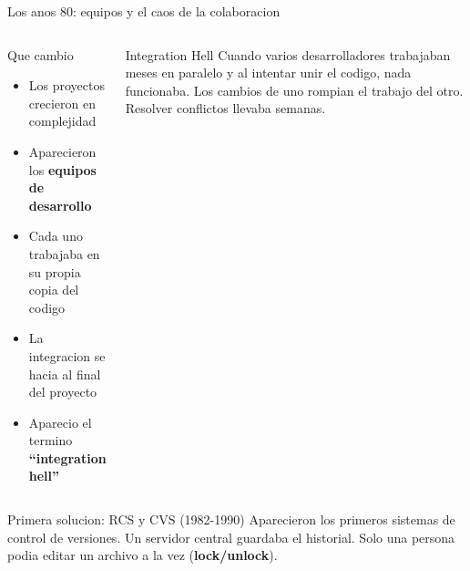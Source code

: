 \documentclass[aspectratio=169]{beamer}
\begin{document}
\begin{frame}{Los anos 80: equipos y el caos de la colaboracion}
  \begin{columns}
    \begin{block}{Que cambio}
      \begin{itemize}
        \item Los proyectos crecieron en complejidad
        \item Aparecieron los \textbf{equipos de desarrollo}
        \item Cada uno trabajaba en su propia copia del codigo
        \item La integracion se hacia al final del proyecto
        \item Aparecio el termino \textbf{``integration hell''}
      \end{itemize}
    \end{block}

    \begin{alertblock}{Integration Hell}
      Cuando varios desarrolladores trabajaban meses en paralelo y al intentar unir el codigo, nada funcionaba. Los cambios de uno rompian el trabajo del otro. Resolver conflictos llevaba semanas.
    \end{alertblock}
  \end{columns}

  \vspace{0.4cm}

  \begin{exampleblock}{Primera solucion: RCS y CVS (1982-1990)}
    Aparecieron los primeros sistemas de control de versiones. Un servidor central guardaba el historial. Solo una persona podia editar un archivo a la vez (\textbf{lock/unlock}).
  \end{exampleblock}
\end{frame}
\end{document}
